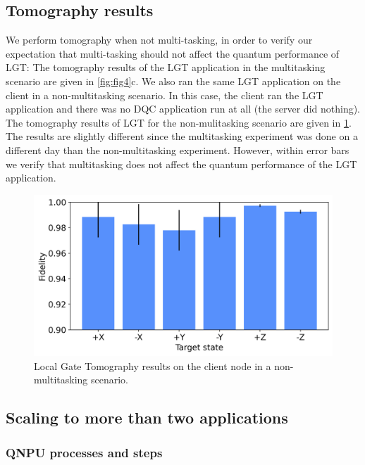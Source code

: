 \subsection{Tomography results}
\label{qnodeos:sec:multitasking-tomography}

We perform tomography when not multi-tasking, in order to verify our expectation that multi-tasking should not affect the quantum performance of \ac{LGT}: The tomography results of the \ac{LGT} application in the multitasking scenario are given in \cref{fig:fig4}c. We also ran the same \ac{LGT} application on the client in a non-multitasking scenario. In this case, the client ran the \ac{LGT} application and there was no \ac{DQC} application run at all (the server did nothing). The tomography results of \ac{LGT} for the non-mulitasking scenario are given in \cref{fig:tomography-no-multitasking}. The results are slightly different since the multitasking experiment was done on a different day than the non-multitasking experiment. However, within error bars we verify that multitasking does not affect the quantum performance of the \ac{LGT} application.

\begin{figure}
\centering
\includegraphics[width=\linewidth]{figures/qnodeos/supplementary/plots/noMT_gate_tomography.png}
\caption{Local Gate Tomography results on the client node in a non-multitasking scenario.}
\label{fig:tomography-no-multitasking}
\end{figure}

\subsection{Scaling to more than two applications}
\label{qnodeos:sec:multitasking-scaling}

\subsubsection{QNPU processes and steps}

